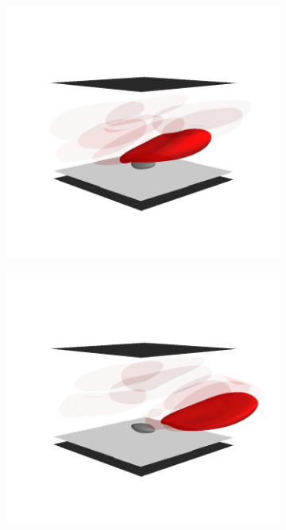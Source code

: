 \begin{figure}[th!]
    \vspace{11pt}

    \begin{subfigure}[t]{0.5\textwidth}
        \includegraphics[trim=50 75 50 125, clip, width=\textwidth]{figures/flyover530.png}%
    \end{subfigure}%
    \begin{subfigure}[t]{0.5\textwidth}
        \includegraphics[trim=50 75 50 125, clip, width=\textwidth]{figures/flyover565.png}%
    \end{subfigure}


\end{figure}
